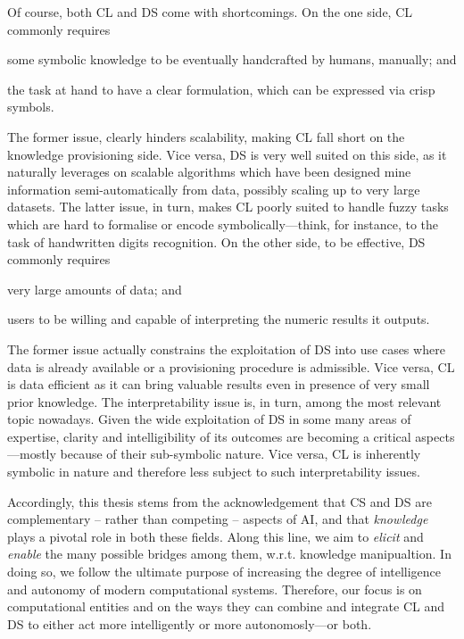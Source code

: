 \documentclass[12pt,a4paper,openright,twoside]{book}
\begin{document}
Of course, both CL and DS come with shortcomings.
%
On the one side, CL commonly requires
%
\begin{inlinelist}
    \item some symbolic knowledge to be eventually handcrafted by humans, manually; and
    \item the task at hand to have a clear formulation, which can be expressed via crisp symbols.
\end{inlinelist}
%
The former issue, clearly hinders scalability, making CL fall short on the knowledge provisioning side.
%
Vice versa, DS is very well suited on this side, as it naturally leverages on scalable algorithms which have been designed mine information semi-automatically from data, possibly scaling up to very large datasets.
%
The latter issue, in turn, makes CL poorly suited to handle fuzzy tasks which are hard to formalise or encode symbolically---think, for instance, to the task of handwritten digits recognition.
%
On the other side, to be effective, DS commonly requires
%
\begin{inlinelist}
    \item very large amounts of data; and
    \item users to be willing and capable of interpreting the numeric results it outputs.
\end{inlinelist}
%
The former issue actually constrains the exploitation of DS into use cases where data is already available or a provisioning procedure is admissible.
%
Vice versa, CL is data efficient as it can bring valuable results even in presence of very small prior knowledge.
%
The interpretability issue is, in turn, among the most relevant topic nowadays.
%
Given the wide exploitation of DS in some many areas of expertise, clarity and intelligibility of its outcomes are becoming a critical aspects---mostly because of their sub-symbolic nature.
%
Vice versa, CL is inherently symbolic in nature and therefore less subject to such interpretability issues.

Accordingly, this thesis stems from the acknowledgement that CS and DS are complementary -- rather than competing -- aspects of AI, and that \emph{knowledge} plays a pivotal role in both these fields.
%
Along this line, we aim to \emph{elicit} and \emph{enable} the many possible bridges among them, w.r.t. knowledge manipualtion.
%
In doing so, we follow the ultimate purpose of increasing the degree of intelligence and autonomy of modern computational systems.
%
Therefore, our focus is on computational entities and on the ways they can combine and integrate CL and DS to either act more intelligently or more autonomosly---or both. 
\end{document}
